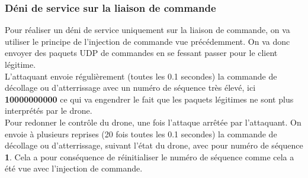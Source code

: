 \subsubsection{Déni de service sur la liaison de commande}
Pour réaliser un déni de service uniquement sur la liaison de commande, on va utiliser le principe de l'injection de commande vue précédemment. On va donc envoyer des paquets UDP de commandes en se fessant passer pour le client légitime.\\
L'attaquant envoie régulièrement (toutes les 0.1 secondes) la commande de décollage ou d'atterrissage avec un numéro de séquence très élevé, ici \textbf{10000000000} ce qui va engendrer le fait que les paquets légitimes ne sont plus interprétés par le drone.\\
Pour redonner le contrôle du drone, une fois l'attaque arrêtée par l'attaquant. On envoie à plusieurs reprises (20 fois toutes les 0.1 secondes) la commande de décollage ou d'atterrissage, suivant l'état du drone, avec pour numéro de séquence \textbf{1}. Cela a pour conséquence de réinitialiser le numéro de séquence comme cela a été vue avec l'injection de commande.
